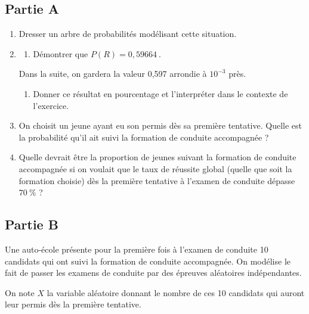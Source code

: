 \documentclass[10pt]{article}
\providecommand{\np}[2][]{{#2~#1}}
\begin{document}
	\subsection*{Partie A}
		\begin{enumerate}
			\item Dresser un arbre de probabilités modélisant cette situation.
			\item \begin{enumerate}
				\item Démontrer que $P(R)= \np{0,59664}$.
			\end{enumerate}

			Dans la suite, on gardera la valeur 0,597 arrondie à $10^{-3}$ près.

			\begin{enumerate}[resume]
				\item Donner ce résultat en pourcentage et l'interpréter dans le contexte de l'exercice.
			\end{enumerate}

			\item On choisit un jeune ayant eu son permis dès sa première tentative. Quelle est la probabilité qu'il ait suivi la formation de conduite accompagnée ?

			\item Quelle devrait être la proportion de jeunes suivant la formation de conduite accompagnée si on voulait que le taux de réussite global (quelle que soit la formation choisie) dès la première tentative à l'examen de conduite dépasse $70~\%$ ?
		\end{enumerate}

	\subsection*{Partie B}
		Une auto-école présente pour la première fois à l'examen de conduite 10 candidats qui ont suivi la formation de conduite accompagnée. On modélise le fait de passer les examens de conduite par des épreuves aléatoires indépendantes.

		\medskip

		On note $X$ la variable aléatoire donnant le nombre de ces 10 candidats qui auront leur permis dès la première tentative.
\end{document}
